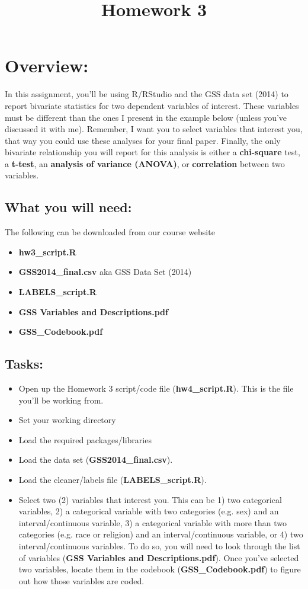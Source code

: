 \documentclass{article}
\begin{document}
\title{Homework 3}
\author[*]{}
\date{}
\maketitle



\section*{Overview:}
In this assignment, you'll be using R/RStudio and the GSS data set (2014) to report bivariate statistics for two dependent variables of interest. These variables must be different than the ones I present in the example below (unless you've discussed it with me). Remember, I want you to select variables that interest you, that way you could use these analyses for your final paper. Finally, the only bivariate relationship you will report for this analysis is either a {\bf{chi-square}} test, a {\bf{t-test}}, an {\bf{analysis of variance (ANOVA)}}, or {\bf{correlation}} between two variables.

\subsection*{What you will need:}
The following can be downloaded from our course website
\begin{itemize}
\item \textbf{hw3\_script.R}
\item \textbf{GSS2014\_final.csv} aka GSS Data Set (2014)
\item \textbf{LABELS\_script.R}
\item \textbf{GSS Variables and Descriptions.pdf}
\item \textbf{GSS\_Codebook.pdf}
\end{itemize}


\subsection*{Tasks:}
\begin{itemize}
\item Open up the Homework 3 script/code file (\textbf{hw4\_script.R}). This is the file you'll be working from.
\item Set your working directory
\item Load the required packages/libraries
\item Load the data set (\textbf{GSS2014\_final.csv}).
\item Load the cleaner/labels file (\textbf{LABELS\_script.R}).
\item Select two (2) variables that interest you. This can be 1) two categorical variables, 2) a categorical variable with two categories (e.g. sex) and an interval/continuous variable, 3) a categorical variable with more than two categories (e.g. race or religion) and an interval/continuous variable, or 4) two interval/continuous variables. To do so, you will need to look through the list of variables (\textbf{GSS Variables and Descriptions.pdf}). Once you've selected two variables, locate them in the codebook (\textbf{GSS\_Codebook.pdf}) to figure out how those variables are coded.
\end{itemize}
\end{document}
